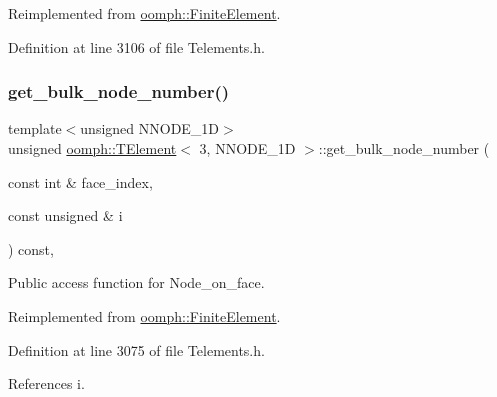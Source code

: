 Reimplemented from \hyperlink{classoomph_1_1FiniteElement_a9db1456b827131c21a991ac9fedf4b0c}{oomph\+::\+Finite\+Element}.



Definition at line 3106 of file Telements.\+h.

\mbox{\label{classoomph_1_1TElement_3_013_00_01NNODE__1D_01_4_a0963eb2707a18c7b9aeb46338a0cb2ea}} 
\subsubsection{\texorpdfstring{get\+\_\+bulk\+\_\+node\+\_\+number()}{get\_bulk\_node\_number()}}
{\footnotesize\ttfamily template$<$unsigned N\+N\+O\+D\+E\+\_\+1D$>$ \\
unsigned \hyperlink{classoomph_1_1TElement}{oomph\+::\+T\+Element}$<$ 3, N\+N\+O\+D\+E\+\_\+1D $>$\+::get\+\_\+bulk\+\_\+node\+\_\+number (\begin{DoxyParamCaption}\item[{const int \&}]{face\+\_\+index,  }\item[{const unsigned \&}]{i }\end{DoxyParamCaption}) const\hspace{0.3cm}{\ttfamily [inline]}, {\ttfamily [virtual]}}



Public access function for Node\+\_\+on\+\_\+face. 



Reimplemented from \hyperlink{classoomph_1_1FiniteElement_a2cd0ee849adf50dae1a70a20fab47119}{oomph\+::\+Finite\+Element}.



Definition at line 3075 of file Telements.\+h.



References i.

\mbox{\label{classoomph_1_1TElement_3_013_00_01NNODE__1D_01_4_af2cefb5ff09aa773e5ddad809b6eb485}} 
